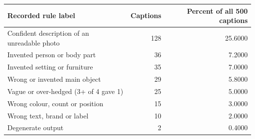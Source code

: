 \begin{tabular}{lrr}
\toprule
Recorded rule label & Captions & Percent of all 500 captions \\
\midrule
Confident description of an unreadable photo & 128 & 25.6000 \\
Invented person or body part & 36 & 7.2000 \\
Invented setting or furniture & 35 & 7.0000 \\
Wrong or invented main object & 29 & 5.8000 \\
Vague or over-hedged (3+ of 4 gave 1) & 25 & 5.0000 \\
Wrong colour, count or position & 15 & 3.0000 \\
Wrong text, brand or label & 10 & 2.0000 \\
Degenerate output & 2 & 0.4000 \\
\bottomrule
\end{tabular}
